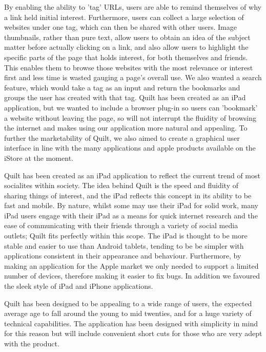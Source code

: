 \documentclass[a4wide, 10pt]{article}
\begin{document}
By enabling the ability to 'tag' URLs, users are able to remind themselves of why a link held initial interest. Furthermore, users can collect a large selection of websites under one tag, which can then be shared with other users. Image thumbnails, rather than pure text, allow users to obtain an idea of the subject matter before actually clicking on a link, and also allow users to highlight the specific parts of the page that holds interest, for both themselves and friends. This enables them to browse those websites with the most relevance or interest first and less time is wasted gauging a page's overall use. We also wanted a search feature, which would take a tag as an input and return the bookmarks and groups the user has created with that tag. Quilt has been created as an iPad application, but we wanted to include a browser plug-in so users can 'bookmark' a website without leaving the page, so will not interrupt the fluidity of browsing the internet and makes using our application more natural and appealing. To further the marketability of Quilt, we also aimed to create a graphical user interface in line with the many applications and apple products available on the iStore at the moment. 

Quilt has been created as an iPad application to reflect the current trend of most socialites within society. The idea behind Quilt is the speed and fluidity of sharing things of interest, and the iPad reflects this concept in its ability to be fast and mobile. By nature, whilst some may use their iPad for solid work, many iPad users engage with their iPad as a means for quick internet research and the ease of communicating with their friends through a variety of social media outlets; Quilt fits perfectly within this scope. The iPad is thought to be more stable and easier to use than Android tablets, tending to be be simpler with applications consistent in their appearance and behaviour. Furthermore, by making an application for the Apple market we only needed to support a limited number of devices, therefore making it easier to fix bugs. In addition we favoured the sleek style of iPad and iPhone applications. 

Quilt has been designed to be appealing to a wide range of users, the expected average age to fall around the young to mid twenties, and for a huge variety of technical capabilities. The application has been designed with simplicity in mind for this reason but will include convenient short cuts for those who are very adept with the product.
\end{document}
